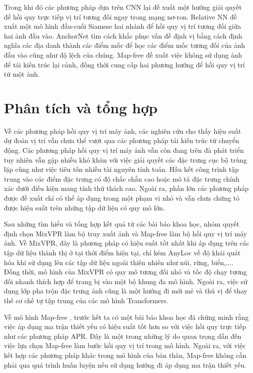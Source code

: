 Trong khi đó các phương pháp dựa trên CNN \cite{melekhov2017relative, saha2018improved, arnold2022mapfree} lại đề xuất một hướng giải quyết để hồi quy trực tiếp vị trí tương đối ngay trong mạng nơ-ron. Relative NN \cite{melekhov2017relative} đề xuất một mô hình đầu-cuối Siamese hai nhánh để hồi quy vị trí tương đối giữa hai ảnh đầu vào. AnchorNet \cite{saha2018improved} tìm cách khắc phục vấn đề định vị bằng cách định nghĩa các địa danh thành các điểm mốc để học các điểm mốc tương đối của ảnh đầu vào cũng như độ lệch của chúng. Map-free \cite{arnold2022mapfree} đề xuất việc không sử dụng ảnh để tái kiến trúc lại cảnh, đồng thời cung cấp hai phương hướng để hồi quy vị trí từ một ảnh.

\section{Phân tích và tổng hợp}
Về các phương pháp hồi quy vị trí máy ảnh, các nghiên cứu cho thấy hiệu suất dự đoán vị trí vẫn chưa thể vượt qua các phương pháp tái kiến trúc từ chuyển động. Các phương pháp hồi quy vị trí máy ảnh vẫn còn đang trên đà phát triển tuy nhiên vẫn gặp nhiều khó khăn với việc giải quyết các đặc trưng cục bộ trùng lặp cũng như việc tiêu tốn nhiều tài nguyên tính toán. Hầu hết công trình tập trung vào các điểm đặc trưng có độ chắc chắn cao hoặc mô tả đặc trưng chính xác dưới điều kiện mang tính thử thách cao. Ngoài ra, phần lớn các phương pháp được đề xuất chỉ có thể áp dụng trong một phạm vi nhỏ và vẫn chưa chứng tỏ được hiệu suất trên những tập dữ liệu có quy mô lớn.

Sau những tìm hiểu và tổng hợp kết quả từ các bài báo khoa học, nhóm quyết định chọn MixVPR \cite{alibey2023mixvpr} làm bộ truy xuất ảnh và Map-free \cite{arnold2022mapfree} làm bộ hồi quy vị trí máy ảnh. Về MixVPR, đây là phương pháp có hiệu suất tốt nhất khi áp dụng trên các tập dữ liệu thành thị ở tại thời điểm hiện tại, chỉ kém AnyLoc \cite{keetha2023anyloc} về độ khái quát hóa khi sử dụng lên các tập dữ liệu ngoài thiên nhiên như núi, rừng, biển,.... Đồng thời, mô hình của MixVPR có quy mô tương đối nhỏ và tốc độ chạy tương đối nhanh thích hợp để trang bị vào một bộ khung đa mô hình. Ngoài ra, việc sử dụng lớp pha trộn đặc trưng ảnh cũng là một hướng đi mới mẻ và thú vị để thay thế cơ chế tự tập trung của các mô hình Transformers.

Về mô hình Map-free \cite{arnold2022mapfree}, trước hết ta có một bài báo khoa học \cite{sattler2019understanding} đã chứng minh rằng việc áp dụng ma trận thiết yếu có hiệu suất tốt hơn so với việc hồi quy trực tiếp như các phương pháp APR. Đây là một trong những lý do quan trọng dẫn đến việc lựa chọn Map-free làm bước hồi quy vị trí trong mô hình. Ngoài ra, với việc kết hợp các phương pháp khác trong mô hình của bản thân, Map-free không cần phải qua quá trình huấn luyện nếu sử dụng hướng đi áp dụng ma trận thiết yếu.

